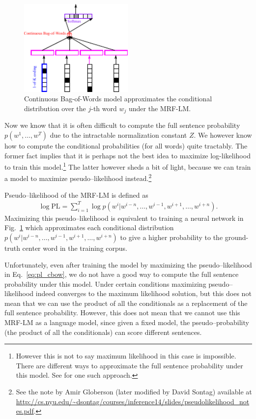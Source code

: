 \documentclass{report}
\newcommand{\PL}{\text{PL}}
\begin{document}
\begin{figure}[ht]
    \centering
    \includegraphics[width=0.5\textwidth]{figures/cbow.pdf}
    \caption{Continuous Bag-of-Words model approximates the conditional
    distribution over the $j$-th word $w_j$ under the MRF-LM.}
    \label{fig:cbow}
\end{figure}

Now we know that it is often difficult to compute the full sentence probability
$p(w^1, \ldots, w^T)$ due to the intractable normalization constant $Z$. We
however know how to compute the conditional probabilities (for all words) quite
tractably. The former fact implies that it is perhaps not the best idea to
maximize log-likelihood to train this model.\footnote{
    However this is not to say maximum likelihood in this case is impossible.
    There are different ways to approximate the full sentence probability under
    this model. See \cite{jernite2015fast} for one such approach.
} The latter however sheds a bit of light, because we can train a model to
maximize pseudo--likelihood \cite{besag1975statistical} instead.\footnote{
    See the note by Amir Globerson (later modified by David Sontag) available at
    \url{http://cs.nyu.edu/~dsontag/courses/inference14/slides/pseudolikelihood_notes.pdf}.
}

Pseudo--likelihood of the MRF-LM is defined as
\begin{align}
    \label{eq:pl_cbow}
    \log \PL = \sum_{i=1}^T \log p(w^i | w^{i-n}, \ldots, w^{i-1}, w^{i+1}, \ldots,
    w^{i+n}).
\end{align}
Maximizing this pseudo--likelihood is equivalent to training a neural network in
Fig.~\ref{fig:cbow} which approximates each conditional distribution $p(w^i |
w^{i-n}, \ldots, w^{i-1}, w^{i+1}, \ldots, w^{i+n})$ to give a higher
probability to the ground-truth center word in the training corpus.

Unfortunately, even after training the model by maximizing the pseudo--likelihood
in Eq.~\eqref{eq:pl_cbow}, we do not have a good way to compute the full
sentence probability under this model. Under certain conditions maximizing
pseudo--likelihood indeed converges to the maximum likelihood solution, but this
does not mean that we can use the product of all the conditionals as a
replacement of the full sentence probability. However, this does not mean that
we cannot use this MRF-LM as a language model, since given a fixed model, the
pseudo--probability (the product of all the conditionals) can score different
sentences. 
\end{document}
